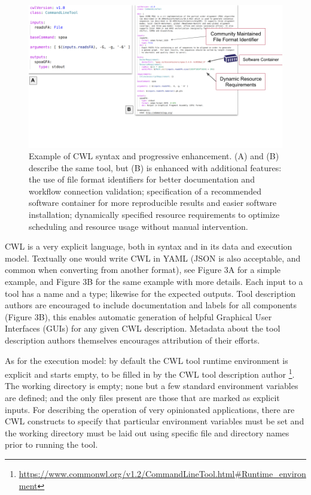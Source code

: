 \documentclass[sigconf,authordraft]{acmart}
\begin{document}
\begin{figure}
  \centering
  \includegraphics[width=\textwidth]{figure3.png}
  \caption{Example of CWL syntax and progressive enhancement. (A) and
(B) describe the same tool, but (B) is enhanced with additional
features: the use of file format identifiers for better documentation
and workflow connection validation; specification of a recommended
software container for more reproducible results and easier software
installation; dynamically specified resource requirements to optimize
scheduling and resource usage without manual intervention.}
\end{figure}

CWL is a very explicit language, both in syntax and in its data and
execution model. Textually one would write CWL in YAML (JSON is also
acceptable, and common when converting from another format), see Figure
3A for a simple example, and Figure 3B for the same example with more
details. Each input to a tool has a name and a type; likewise for the
expected outputs. Tool description authors are encouraged to include
documentation and labels for all components (Figure 3B), this enables
automatic generation of helpful Graphical User Interfaces (GUIs) for any
given CWL description. Metadata about the tool description authors
themselves encourages attribution of their efforts.

As for the execution model: by default the CWL tool runtime environment
is explicit and starts empty, to be filled in by the CWL tool
description author \footnote{\url{https://www.commonwl.org/v1.2/CommandLineTool.html\#Runtime_environment}}.
The working directory is empty; none but a few standard environment
variables are defined; and the only files present are those that are
marked as explicit inputs. For describing the operation of very
opinionated applications, there are CWL constructs to specify that
particular environment variables must be set and the working directory
must be laid out using specific file and directory names prior to
running the tool.
\end{document}
